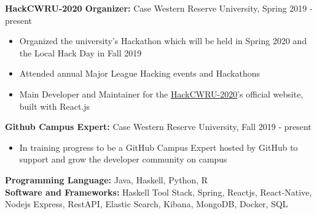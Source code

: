 \documentclass[a4paper,11pt]{article}
\begin{document}
\begin{flushleft}
	
	\textbf{HackCWRU-2020 Organizer: } Case Western Reserve University, Spring 2019 - 
	present
	\vspace{-\topsep}
	\begin{itemize}
		\setlength{\parskip}{2pt}
		\setlength{\itemsep}{0pt plus 1pt}
		\item Organized the university's Hackathon which will be held in Spring 2020 and the Local Hack Day in Fall 2019 \\
		\item Attended annual Major League Hacking events and Hackathons
		\item Main Developer and Maintainer for the \href{https://hackcwru.info}{HackCWRU-2020}'s official website, built with React.js
	\end{itemize}
	
	
	\textbf{Github Campus Expert: } Case Western Reserve University, Fall 2019 - present
	\vspace{-\topsep}
		\begin{itemize}
			\setlength{\parskip}{2pt}
			\setlength{\itemsep}{0pt plus 10pt}
			\item In training progress to be a GitHub Campus Expert hosted by GitHub to support and grow the developer community on campus
		\end{itemize}
\centering{\noindent\makebox{\rule{8cm}{1.5pt}}}
\end{flushleft} 
\begin{flushleft}
	\textbf{Programming Language:} Java, Haskell, Python, R \\ 
	\doublespacing
	\textbf{Software and Frameworks:} Haskell Tool Stack, Spring, Reactjs, React-Native, Nodejs Express, RestAPI, Elastic Search, Kibana, MongoDB, Docker, SQL \\
	\vspace{-\topsep}
	
\end{flushleft}
\end{document}
